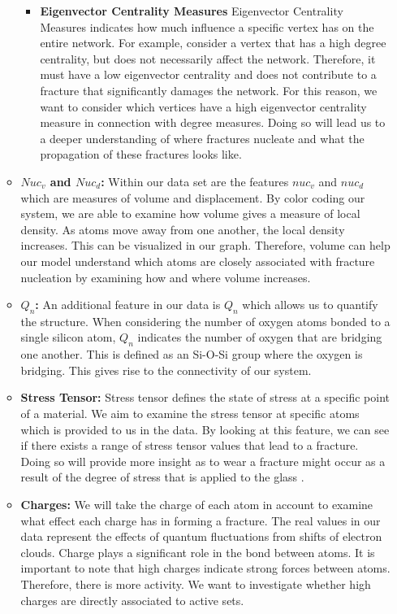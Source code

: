 \begin{itemize}
\begin{itemize}
    \begin{itemize}
        \item \textbf{Eigenvector Centrality Measures } Eigenvector Centrality Measures indicates how much influence a specific vertex has on the entire network. For example, consider a vertex that has a high degree centrality, but does not necessarily affect the network. Therefore, it must have a low eigenvector centrality and does not contribute to a fracture that significantly damages the network. For this reason, we want to consider which vertices have a high eigenvector centrality measure in connection with degree measures. Doing so will lead us to a deeper understanding of where fractures nucleate and what the propagation of  these fractures looks like.
    \end{itemize}
\item \textbf{$Nuc_v$ and $Nuc_d$:} Within our data set are the features $nuc_v$ and $nuc_d$ which are measures of volume and displacement. By color coding our system, we are able to examine how volume gives a measure of local density. As atoms move away from one another, the local density increases. This can be visualized in our graph. Therefore, volume can help our model understand which atoms are closely associated with fracture nucleation by examining how and where volume increases.

\item\textbf{$Q_n$:} An additional feature in our data is $Q_n$ which allows us to quantify the structure. When considering the number of oxygen atoms bonded to a single silicon atom, $Q_n$ indicates the number of oxygen that are bridging one another. This is defined as an Si-O-Si group where the oxygen is bridging. This gives rise to the connectivity of our system.

\item\textbf{Stress Tensor:} Stress tensor defines the state of stress at a specific point of a material. We aim to examine the stress tensor at specific atoms which is provided to us in the data. By looking at this feature, we can see if there exists a range of stress tensor values that lead to a fracture. Doing so will provide more insight as to wear a fracture might occur as a result of the degree of stress that is applied to the glass \cite{mWilson_continuum_stress} \cite{elastic_fracture}.

\item\textbf{Charges:} We will take the charge of each atom in account to examine what effect each charge has in forming a fracture. The real values in our data represent the effects of quantum fluctuations from shifts of electron clouds. Charge plays a significant role in the bond between atoms. It is important to note that high charges indicate strong forces between atoms. Therefore, there is more activity. We want to investigate whether high charges are directly associated to active sets. 
\end{itemize}


\end{itemize}
